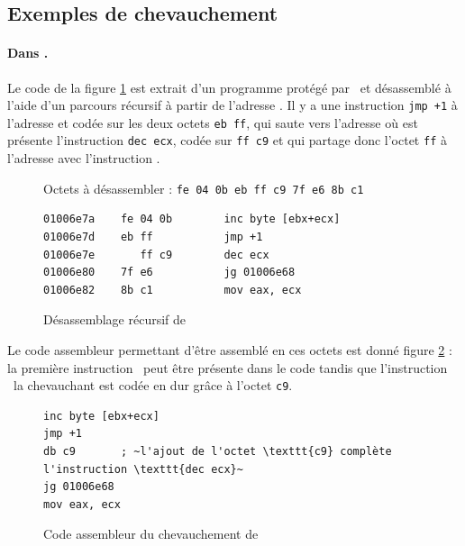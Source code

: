 \subsection*{Exemples de chevauchement}

\paragraph{Dans \telock.}
Le code de la figure \ref{fig:telock_obf_disas} est extrait d'un programme protégé par \telock\ et désassemblé à l'aide d'un parcours récursif à partir de l'adresse . Il y a une instruction \texttt{jmp +1} à l'adresse  et codée sur les deux octets \texttt{eb ff}, qui saute vers l'adresse  où est présente l'instruction \texttt{dec ecx}, codée sur \texttt{ff c9} et qui partage donc l'octet \texttt{ff} à l'adresse  avec l'instruction \jmp.

\begin{figure}[h]
Octets à désassembler : \texttt{fe 04 0b eb ff c9 7f e6 8b c1}
\begin{lstlisting}[language={[x86masm]Assembler}, escapechar=~]
01006e7a    fe 04 0b        inc byte [ebx+ecx]
01006e7d    eb ff           jmp +1
01006e7e       ff c9        dec ecx
01006e80    7f e6           jg 01006e68
01006e82    8b c1           mov eax, ecx
\end{lstlisting}
\caption{Désassemblage récursif de \telock}
\label{fig:telock_obf_disas}
\end{figure}

Le code assembleur permettant d'être assemblé en ces octets est donné figure \ref{fig:telock_obf_asm} : la première instruction \jmp\ peut être présente dans le code tandis que l'instruction \dec\ la chevauchant est codée en dur grâce à l'octet \texttt{c9}.

\begin{figure}[h]
\begin{lstlisting}[language={[x86masm]Assembler}, escapechar=~]
inc byte [ebx+ecx]
jmp +1
db c9 		; ~l'ajout de l'octet \texttt{c9} complète l'instruction \texttt{dec ecx}~
jg 01006e68
mov eax, ecx
\end{lstlisting}
\caption{Code assembleur du chevauchement de \telock}
\label{fig:telock_obf_asm}
\end{figure}


